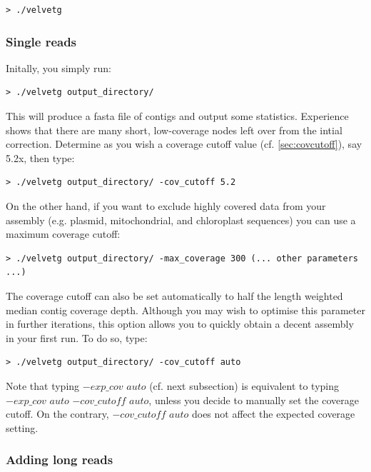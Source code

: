 \documentclass{article}
\begin{document}
\begin{verbatim}
> ./velvetg
\end{verbatim}

	\subsubsection{Single reads}
	
	\label{sec:velvetg}

Initally, you simply run: 
\begin{verbatim}
> ./velvetg output_directory/
\end{verbatim}

This will produce a fasta file of contigs and output some statistics.
Experience shows that there are many short, low-coverage nodes left over from the intial correction. Determine as you wish a coverage cutoff value (cf. \ref{sec:covcutoff}), say 5.2x, then type:

\begin{verbatim}
> ./velvetg output_directory/ -cov_cutoff 5.2
\end{verbatim}

On the other hand, if you want to exclude highly covered data from your assembly (e.g. plasmid, mitochondrial, and chloroplast sequences) you can use a maximum coverage cutoff:

\begin{verbatim}
> ./velvetg output_directory/ -max_coverage 300 (... other parameters ...)
\end{verbatim}

The coverage cutoff can also be set automatically to half the length weighted median contig coverage depth. Although you may wish to optimise this parameter in further iterations, this option allows you to quickly obtain a decent assembly in your first run. To do so, type:

\begin{verbatim}
> ./velvetg output_directory/ -cov_cutoff auto
\end{verbatim}

Note that typing $-exp\_cov$ $auto$ (cf. next subsection) is equivalent to typing $-exp\_cov$ $auto$ $-cov\_cutoff$ $auto$, unless you decide to manually set the coverage cutoff. On the contrary, $-cov\_cutoff$ $auto$ does not affect the expected coverage setting.

	\subsubsection{Adding long reads}
	
\end{document}
